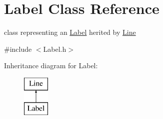\hypertarget{class_label}{}\section{Label Class Reference}
\label{class_label}


class representing an \mbox{\hyperlink{class_label}{Label}} herited by \mbox{\hyperlink{class_line}{Line}}  




{\ttfamily \#include $<$Label.\+h$>$}

Inheritance diagram for Label\+:\begin{figure}[H]
\begin{center}
\leavevmode
\includegraphics[height=2.000000cm]{class_label}
\end{center}
\end{figure}
